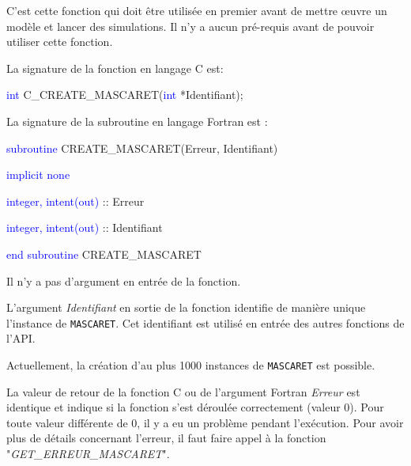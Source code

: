 \documentclass[a4paper,11pt]{article}
\begin{document}
 \vspace{0.5cm}
 
 C'est cette fonction qui doit \^etre utilis\'ee en premier avant de mettre \oe uvre un mod\`ele et lancer des simulations. Il n'y a aucun pr\'e-requis avant de pouvoir utiliser cette fonction.
 
 \vspace{0.5cm}
 
 La signature de la fonction en langage C est:
 
 \vspace{0.5cm}
 
 \textcolor{blue}{int} C\_CREATE\_MASCARET(\textcolor{blue}{int} *Identifiant);
 
 \vspace{0.5cm} 
 
 La signature de la subroutine en langage Fortran est :
 
 \vspace{0.5cm}
 
    \textcolor{blue}{subroutine} CREATE\_MASCARET(Erreur, Identifiant)
    
        \hspace{1cm}\textcolor{blue}{implicit none}                 
        
        \hspace{1cm} \textcolor{blue}{integer, intent(out)} :: Erreur
        
        \hspace{1cm} \textcolor{blue}{integer, intent(out)} :: Identifiant
        
    \textcolor{blue}{end subroutine} CREATE\_MASCARET

  \vspace{0.5cm}

 Il n'y a pas d'argument en entr\'ee de la fonction.
 
 \vspace{0.5cm}
  
 L'argument \textit{Identifiant} en sortie de la fonction identifie de mani\`ere unique l'instance de \texttt{MASCARET}. Cet identifiant est utilis\'e en entr\'ee des autres fonctions de l'API.
 
 \vspace{0.5cm}
  
 Actuellement, la cr\'eation d'au plus 1000 instances de \texttt{MASCARET} est possible.
 
 \vspace{0.5cm}
  
 La valeur de retour de la fonction C ou de l'argument Fortran \textit{Erreur} est identique et indique si la fonction s'est d\'eroul\'ee correctement (valeur 0). Pour toute valeur diff\'erente de 0, il y a eu un probl\`eme pendant l'ex\'ecution. Pour avoir plus de d\'etails concernant l'erreur, il faut faire appel \`a la fonction "\textit{GET\_ERREUR\_MASCARET}".
  
\end{document}
